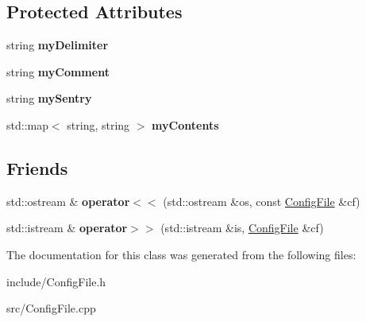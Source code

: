 \subsection*{Protected Attributes}
\begin{DoxyCompactItemize}
\item 
\hypertarget{classConfigFile_ad63f3e259f665192b64fb3e83c701425}{string {\bfseries my\-Delimiter}}\label{classConfigFile_ad63f3e259f665192b64fb3e83c701425}

\item 
\hypertarget{classConfigFile_a2c60a141e8ad012b86a0642ec8ec638d}{string {\bfseries my\-Comment}}\label{classConfigFile_a2c60a141e8ad012b86a0642ec8ec638d}

\item 
\hypertarget{classConfigFile_af066ec1942c50848a055350029ebbca5}{string {\bfseries my\-Sentry}}\label{classConfigFile_af066ec1942c50848a055350029ebbca5}

\item 
\hypertarget{classConfigFile_a5b6b938b1b5410d2e30d2e37f223b513}{std\-::map$<$ string, string $>$ {\bfseries my\-Contents}}\label{classConfigFile_a5b6b938b1b5410d2e30d2e37f223b513}

\end{DoxyCompactItemize}
\subsection*{Friends}
\begin{DoxyCompactItemize}
\item 
\hypertarget{classConfigFile_a8ccacbc37db1992a5515e2c72fc83ce6}{std\-::ostream \& {\bfseries operator$<$$<$} (std\-::ostream \&os, const \hyperlink{classConfigFile}{Config\-File} \&cf)}\label{classConfigFile_a8ccacbc37db1992a5515e2c72fc83ce6}

\item 
\hypertarget{classConfigFile_a25042475439039e70f90febe7d0e63ec}{std\-::istream \& {\bfseries operator$>$$>$} (std\-::istream \&is, \hyperlink{classConfigFile}{Config\-File} \&cf)}\label{classConfigFile_a25042475439039e70f90febe7d0e63ec}

\end{DoxyCompactItemize}


The documentation for this class was generated from the following files\-:\begin{DoxyCompactItemize}
\item 
include/Config\-File.\-h\item 
src/Config\-File.\-cpp\end{DoxyCompactItemize}
